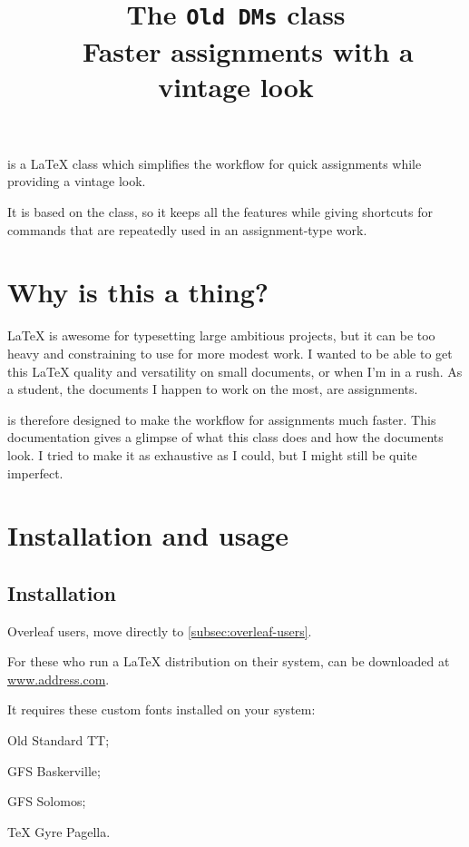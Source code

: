 \documentclass[a4paper, 11pt]{old-dms}
\title{\bfseries \huge The \texttt{Old DMs} class \\~ \vskip -1 \baselineskip \Large Faster assignments with a vintage look}
\date{}
\author{}
\begin{document}
\maketitle

 is a \LaTeX{} class which simplifies the workflow for quick assignments while providing a vintage look.

It is based on the  class, so it keeps all the features while giving shortcuts for commands that are repeatedly used in an assignment-type work.


\setcounter{tocdepth}{2}
\tableofcontents

\newpage


\section*{Why is this a thing?}

\LaTeX{} is awesome for typesetting large ambitious projects, but it can be too heavy and constraining to use for more modest work. I wanted to be able to get this \LaTeX{} quality and versatility on small documents, or when I'm in a rush. As a student, the documents I happen to work on the most, are assignments.

 is therefore designed to make the workflow for assignments much faster. This documentation gives a glimpse of what this class does and how the documents look. I tried to make it as exhaustive as I could, but I might still be quite imperfect.


\section{Installation and usage}


\subsection{Installation}

Overleaf users, move directly to \ref{subsec:overleaf-users}.

For these who run a \LaTeX{} distribution on their system,  can be downloaded at \url{www.address.com}. 

It requires these custom fonts installed on your system:
\begin{ul}
    \item Old Standard TT;
    \item GFS Baskerville;
    \item GFS Solomos;
    \item \TeX{} Gyre Pagella.
\end{ul}
\end{document}
